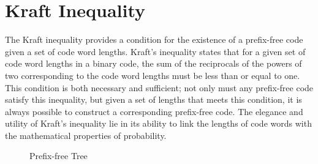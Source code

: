 %
%

\section{Kraft Inequality}

The Kraft inequality provides a condition for the existence of a prefix-free code given a set of code word lengths. Kraft's inequality states that for a given set of code word lengths in a binary code, the sum of the reciprocals of the powers of two corresponding to the code word lengths must be less than or equal to one. This condition is both necessary and sufficient; not only must any prefix-free code satisfy this inequality, but given a set of lengths that meets this condition, it is always possible to construct a corresponding prefix-free code. The elegance and utility of Kraft's inequality lie in its ability to link the lengths of code words with the mathematical properties of probability.

\begin{figure}[t]
\centering
{}
\caption{\label{fig:Prefix-Free-Tree}Prefix-free Tree}
\end{figure}

